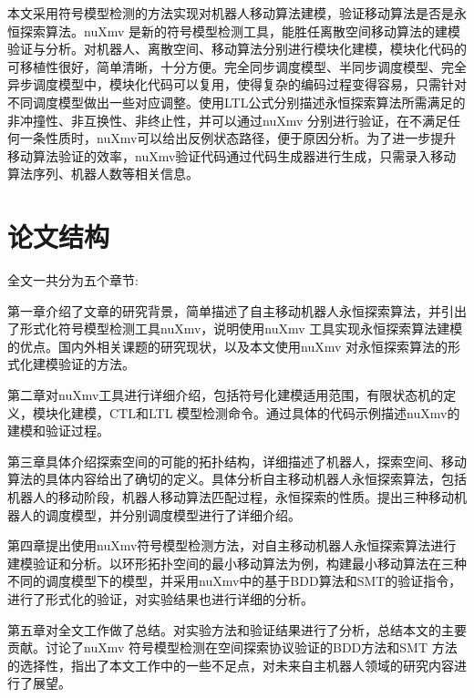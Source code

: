 本文采用符号模型检测的方法实现对机器人移动算法建模，验证移动算法是否是永恒探索算法。nuXmv 是新的符号模型检测工具，能胜任离散空间移动算法的建模验证与分析。对机器人、离散空间、移动算法分别进行模块化建模，模块化代码的可移植性很好，简单清晰，十分方便。完全同步调度模型、半同步调度模型、完全异步调度模型中，模块化代码可以复用，使得复杂的编码过程变得容易，只需针对不同调度模型做出一些对应调整。使用LTL公式分别描述永恒探索算法所需满足的非冲撞性、非互换性、非终止性，并可以通过nuXmv 分别进行验证，在不满足任何一条性质时，nuXmv可以给出反例状态路径，便于原因分析。为了进一步提升移动算法验证的效率，nuXmv验证代码通过代码生成器进行生成，只需录入移动算法序列、机器人数等相关信息。

\section{论文结构}
全文一共分为五个章节:

第一章介绍了文章的研究背景，简单描述了自主移动机器人永恒探索算法，并引出了形式化符号模型检测工具nuXmv，说明使用nuXmv 工具实现永恒探索算法建模的优点。国内外相关课题的研究现状，以及本文使用nuXmv 对永恒探索算法的形式化建模验证的方法。

第二章对nuXmv工具进行详细介绍，包括符号化建模适用范围，有限状态机的定义，模块化建模，CTL和LTL 模型检测命令。通过具体的代码示例描述nuXmv的建模和验证过程。

第三章具体介绍探索空间的可能的拓扑结构，详细描述了机器人，探索空间、移动算法的具体内容给出了确切的定义。具体分析自主移动机器人永恒探索算法，包括机器人的移动阶段，机器人移动算法匹配过程，永恒探索的性质。提出三种移动机器人的调度模型，并分别调度模型进行了详细介绍。

第四章提出使用nuXmv符号模型检测方法，对自主移动机器人永恒探索算法进行建模验证和分析。以环形拓扑空间的最小移动算法为例，构建最小移动算法在三种不同的调度模型下的模型，并采用nuXmv中的基于BDD算法和SMT的验证指令，进行了形式化的验证，对实验结果也进行详细的分析。

第五章对全文工作做了总结。对实验方法和验证结果进行了分析，总结本文的主要贡献。讨论了nuXmv 符号模型检测在空间探索协议验证的BDD方法和SMT 方法的选择性，指出了本文工作中的一些不足点，对未来自主机器人领域的研究内容进行了展望。
